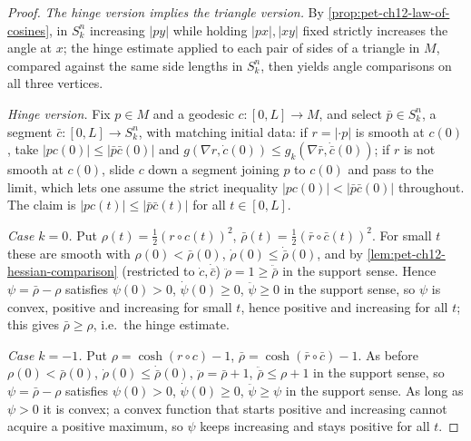 \begin{proof}
  \emph{The hinge version implies the triangle version.} By
  \cref{prop:pet-ch12-law-of-cosines}, in $S_k^n$ increasing $|py|$ while
  holding $|px|,|xy|$ fixed strictly increases the angle at $x$; the hinge
  estimate applied to each pair of sides of a triangle in $M$, compared against
  the same side lengths in $S_k^n$, then yields angle comparisons on all three
  vertices.

  \emph{Hinge version.} Fix $p\in M$ and a geodesic $c:[0,L]\to M$, and select
  $\bar p\in S_k^n$, a segment $\bar c:[0,L]\to S_k^n$, with matching initial
  data: if $r=|{\cdot}p|$ is smooth at $c(0)$, take $|pc(0)|\le|\bar p\bar c(0)|$
  and $g(\nabla r,\dot c(0))\le g_k(\nabla \bar r,\dot{\bar c}(0))$; if $r$ is not
  smooth at $c(0)$, slide $c$ down a segment joining $p$ to $c(0)$ and pass to
  the limit, which lets one assume the strict inequality
  $|pc(0)|<|\bar p\bar c(0)|$ throughout. The claim is $|pc(t)|\le|\bar p\bar
  c(t)|$ for all $t\in[0,L]$.

  \emph{Case $k=0$.} Put $\rho(t)=\tfrac12(r\circ c(t))^2$,
  $\bar\rho(t)=\tfrac12(\bar r\circ\bar c(t))^2$. For small $t$ these are smooth
  with $\rho(0)<\bar\rho(0)$, $\dot\rho(0)\le\dot{\bar\rho}(0)$, and by
  \cref{lem:pet-ch12-hessian-comparison} (restricted to $\dot c,\dot{\bar c}$)
  $\ddot\rho=1\ge\ddot{\bar\rho}$ in the support sense. Hence
  $\psi=\bar\rho-\rho$ satisfies $\psi(0)>0$, $\dot\psi(0)\ge0$,
  $\ddot\psi\ge0$ in the support sense, so $\psi$ is convex, positive and
  increasing for small $t$, hence positive and increasing for all $t$; this
  gives $\bar\rho\ge\rho$, i.e.\ the hinge estimate.

  \emph{Case $k=-1$.} Put $\rho=\cosh(r\circ c)-1$,
  $\bar\rho=\cosh(\bar r\circ\bar c)-1$. As before $\rho(0)<\bar\rho(0)$,
  $\dot\rho(0)\le\dot{\bar\rho}(0)$, $\ddot\rho=\bar\rho+1$,
  $\ddot{\bar\rho}\le\rho+1$ in the support sense, so
  $\psi=\bar\rho-\rho$ satisfies $\psi(0)>0$, $\dot\psi(0)\ge0$,
  $\ddot\psi\ge\psi$ in the support sense. As long as $\psi>0$ it is convex; a
  convex function that starts positive and increasing cannot acquire a positive
  maximum, so $\psi$ keeps increasing and stays positive for all $t$.


\end{proof}
